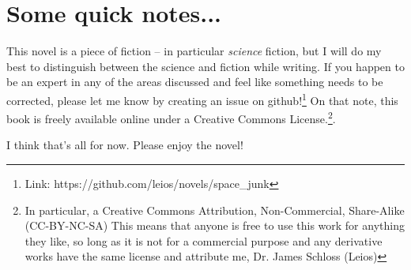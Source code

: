 \chapter*{Some quick notes...}

This novel is a piece of fiction -- in particular \textit{science} fiction, but I will do my best to distinguish between the science and fiction while writing.
If you happen to be an expert in any of the areas discussed and feel like something needs to be corrected, please let me know by creating an issue on github!\footnote{Link: https://github.com/leios/novels/space\_junk}
On that note, this book is freely available online under a Creative Commons License.\footnote{In particular, a Creative Commons Attribution, Non-Commercial, Share-Alike (CC-BY-NC-SA)
This means that anyone is free to use this work for anything they like, so long as it is not for a commercial purpose and any derivative works have the same license and attribute me, Dr. James Schloss (Leios)}.

I think that's all for now.
Please enjoy the novel!
